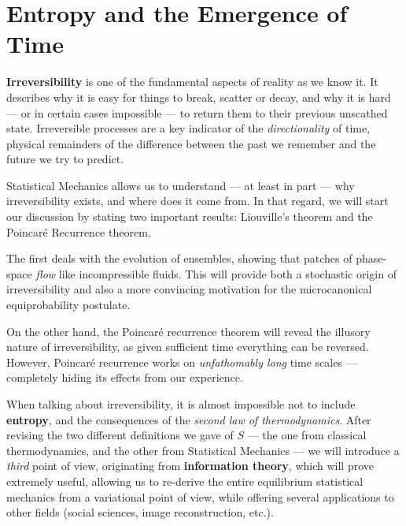 \documentclass[../../main.tex]{subfiles}
\begin{document}
\chapter{Entropy and the Emergence of Time}

\textbf{Irreversibility} is one of the fundamental aspects of reality as we know it. It describes why it is easy for things to break, scatter or decay, and why it is hard --- or in certain cases impossible --- to return them to their previous unscathed state. Irreversible processes are a key indicator of the \textit{directionality} of time, physical remainders of the difference between the past we remember and the future we try to predict.

\medskip

Statistical Mechanics allows us to understand --- at least in part --- why irreversibility exists, and where does it come from. In that regard, we will start our discussion by stating two important results: Liouville's theorem and the Poincaré Recurrence theorem. 

\medskip

The first deals with the evolution of ensembles, showing that patches of phase-space \textit{flow} like incompressible fluids. This will provide both a stochastic origin of irreversibility and also a more convincing motivation for the microcanonical equiprobability postulate.

\medskip

On the other hand, the Poincaré recurrence theorem will reveal the illusory nature of irreversibility, as given sufficient time everything can be reversed. However, Poincaré recurrence works on \textit{unfathomably long} time scales --- completely hiding its effects from our experience. 

\medskip
 
When talking about irreversibility, it is almost impossible not to include \textbf{entropy}, and the consequences of the \textit{second law of thermodynamics}. After revising the two different definitions we gave of $S$ --- the one from classical thermodynamics, and the other from Statistical Mechanics --- we will introduce a \textit{third} point of view, originating from \textbf{information theory}, which will prove extremely useful, allowing us to re-derive the entire equilibrium statistical mechanics from a variational point of view, while offering several applications to other fields (social sciences, image reconstruction, etc.). 
\end{document}
